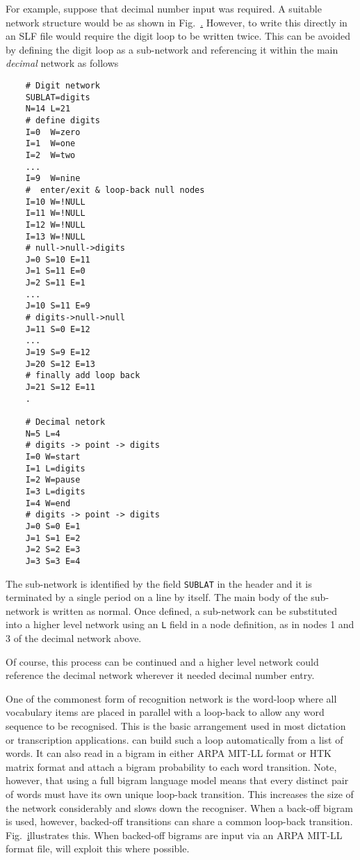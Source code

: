 For example, suppose that decimal number
input was required.  A suitable network structure would be
as shown in Fig.~\href{f:decinet}.  However, to write this directly
in an SLF file would require the digit loop to be written twice.
This can be avoided by defining the digit loop as a sub-network
and referencing it within the main \textit{decimal} network as
follows

\begin{verbatim}
    # Digit network
    SUBLAT=digits
    N=14 L=21
    # define digits
    I=0  W=zero
    I=1  W=one
    I=2  W=two
    ...
    I=9  W=nine
    #  enter/exit & loop-back null nodes
    I=10 W=!NULL
    I=11 W=!NULL
    I=12 W=!NULL
    I=13 W=!NULL
    # null->null->digits
    J=0 S=10 E=11
    J=1 S=11 E=0
    J=2 S=11 E=1
    ...
    J=10 S=11 E=9
    # digits->null->null
    J=11 S=0 E=12
    ...
    J=19 S=9 E=12
    J=20 S=12 E=13
    # finally add loop back
    J=21 S=12 E=11
    .

    # Decimal netork
    N=5 L=4
    # digits -> point -> digits
    I=0 W=start
    I=1 L=digits
    I=2 W=pause
    I=3 L=digits
    I=4 W=end
    # digits -> point -> digits
    J=0 S=0 E=1
    J=1 S=1 E=2
    J=2 S=2 E=3
    J=3 S=3 E=4
\end{verbatim}
The sub-network is identified by the field 
\texttt{SUBLAT} in the header
and it is terminated by a single period on a line by itself.  The
main body of the sub-network is written as normal.
Once defined, a sub-network can be substituted into a higher level
network using an \texttt{L} field in a node definition, as in nodes
1 and 3 of the decimal network above.

Of course, this process can be continued and a higher level network
could reference the decimal network wherever it needed decimal
number entry.


One of the commonest form of recognition network is the 
word-loop
where all vocabulary items are placed in parallel with a loop-back
to allow any word sequence to be recognised.  This is the basic
arrangement used in most dictation or transcription applications.
 can build such a loop automatically from a list
of words.  It can also read in a bigram in either ARPA MIT-LL 
format or HTK matrix format and attach a bigram probability to
each word transition.  Note, however, that using a full bigram
language model means that every distinct pair of words must
have its own unique loop-back transition.  This increases the size of
the network considerably and slows down the recogniser.
When a back-off bigram is used, however, backed-off transitions
can share a common loop-back transition.  Fig.~\href{f:bobig}
illustrates this.  When backed-off bigrams are input via an ARPA MIT-LL 
format file,  will exploit this where possible.

